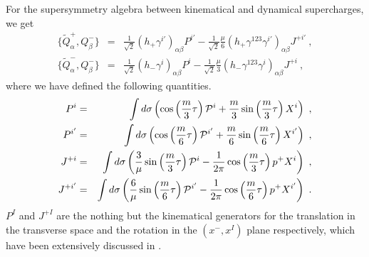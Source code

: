 \documentclass[a4paper,12pt]{article}
\begin{document}
For the supersymmetry algebra between kinematical and dynamical 
supercharges, we get
\begin{eqnarray}
\{ \widetilde{Q}^+_\alpha, Q^-_\beta \}
 &=& \frac{1}{\sqrt{2}} (h_+ \gamma^{i'})_{\alpha \beta} P^{i'}
    -\frac{1}{\sqrt{2}}
      \frac{\mu}{6} (h_+ \gamma^{123} \gamma^{i'})_{\alpha\beta}
       J^{+i'} ~,
  \nonumber \\
\{ \widetilde{Q}^-_\alpha, Q^-_\beta \}
 &=& \frac{1}{\sqrt{2}} (h_- \gamma^i)_{\alpha\beta} P^i
    -\frac{1}{\sqrt{2}}
       \frac{\mu}{3} ( h_- \gamma^{123} \gamma^i)_{\alpha\beta}
       J^{+i} ~,
\end{eqnarray}
where we have defined the following quantities.
\begin{eqnarray}
P^i &=& \int d \sigma 
  \left( \cos \left(\frac{m}{3} \tau \right) {\cal P}^i 
        + \frac{m}{3} \sin \left( \frac{m}{3} \tau \right) X^i
  \right) ~,
  \nonumber \\
P^{i'} &=& \int d \sigma 
  \left( \cos \left(\frac{m}{6} \tau \right) {\cal P}^{i'} 
        + \frac{m}{6} \sin \left( \frac{m}{6} \tau \right) X^{i'}
  \right) ~,
  \nonumber \\
J^{+i} &=& \int d \sigma
  \left( \frac{3}{\mu}
         \sin \left(\frac{m}{3} \tau \right) {\cal P}^i
        - \frac{1}{2 \pi} \cos \left(\frac{m}{3} \tau \right) 
          p^+ X^i
  \right) ~,
  \nonumber \\
J^{+i'} &=& \int d \sigma
  \left( \frac{6}{\mu}
         \sin \left(\frac{m}{6} \tau \right) {\cal P}^{i'} 
        - \frac{1}{2 \pi} \cos \left(\frac{m}{6} \tau \right) 
          p^+ X^{i'}
  \right) ~.
\end{eqnarray}
$P^I$ and $J^{+I}$ are the nothing but the kinematical generators for
the translation in the transverse space and the rotation in the $(x^-,
x^I)$ plane respectively, which have been extensively discussed in
\cite{met044}.
\end{document}
